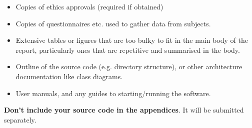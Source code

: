 \documentclass{l4proj}
\begin{document}
\begin{appendices}



\begin{itemize}
\item
  Copies of ethics approvals (required if obtained)
\item
  Copies of questionnaires etc. used to gather data from subjects.
\item
  Extensive tables or figures that are too bulky to fit in the main body of
  the report, particularly ones that are repetitive and summarised in the body.

\item Outline of the source code (e.g. directory structure), or other architecture documentation like class diagrams.

\item User manuals, and any guides to starting/running the software.

\end{itemize}

\textbf{Don't include your source code in the appendices}. It will be
submitted separately.

\end{appendices}






\end{document}
